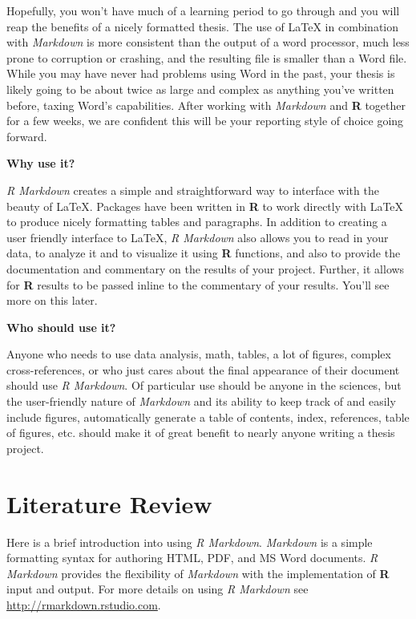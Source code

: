 \documentclass[12pt,twoside]{reedthesis}
\theoremstyle{definition}
\theoremstyle{definition}
\theoremstyle{remark}
\begin{document}
  Hopefully, you won't have much of a learning period to go through and
  you will reap the benefits of a nicely formatted thesis. The use of
  LaTeX in combination with \emph{Markdown} is more consistent than the
  output of a word processor, much less prone to corruption or crashing,
  and the resulting file is smaller than a Word file. While you may have
  never had problems using Word in the past, your thesis is likely going
  to be about twice as large and complex as anything you've written
  before, taxing Word's capabilities. After working with \emph{Markdown}
  and \textbf{R} together for a few weeks, we are confident this will be
  your reporting style of choice going forward.
  
  \textbf{Why use it?}
  
  \emph{R Markdown} creates a simple and straightforward way to interface
  with the beauty of LaTeX. Packages have been written in \textbf{R} to
  work directly with LaTeX to produce nicely formatting tables and
  paragraphs. In addition to creating a user friendly interface to LaTeX,
  \emph{R Markdown} also allows you to read in your data, to analyze it
  and to visualize it using \textbf{R} functions, and also to provide the
  documentation and commentary on the results of your project. Further, it
  allows for \textbf{R} results to be passed inline to the commentary of
  your results. You'll see more on this later.
  
  \textbf{Who should use it?}
  
  Anyone who needs to use data analysis, math, tables, a lot of figures,
  complex cross-references, or who just cares about the final appearance
  of their document should use \emph{R Markdown}. Of particular use should
  be anyone in the sciences, but the user-friendly nature of
  \emph{Markdown} and its ability to keep track of and easily include
  figures, automatically generate a table of contents, index, references,
  table of figures, etc. should make it of great benefit to nearly anyone
  writing a thesis project.
  
  \chapter{Literature Review}\label{lt-review}
  
  Here is a brief introduction into using \emph{R Markdown}.
  \emph{Markdown} is a simple formatting syntax for authoring HTML, PDF,
  and MS Word documents. \emph{R Markdown} provides the flexibility of
  \emph{Markdown} with the implementation of \textbf{R} input and output.
  For more details on using \emph{R Markdown} see
  \url{http://rmarkdown.rstudio.com}.
  
\end{document}
